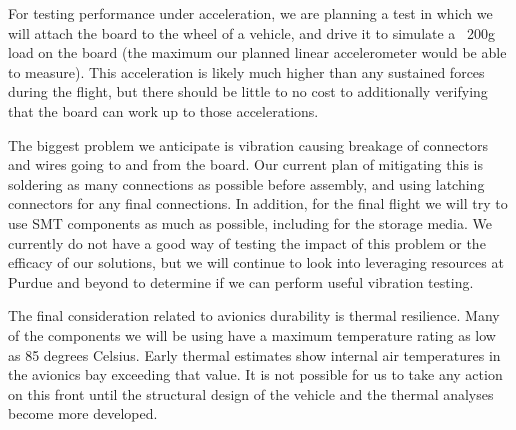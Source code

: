 For testing performance under acceleration, we are planning a test in which we will attach the board to the wheel of a vehicle, and drive it to simulate a ~200g load on the board (the maximum our planned linear accelerometer would be able to measure). This acceleration is likely much higher than any sustained forces during the flight, but there should be little to no cost to additionally verifying that the board can work up to those accelerations.

The biggest problem we anticipate is vibration causing breakage of connectors and wires going to and from the board. Our current plan of mitigating this is soldering as many connections as possible before assembly, and using latching connectors for any final connections. In addition, for the final flight we will try to use SMT components as much as possible, including for the storage media. We currently do not have a good way of testing the impact of this problem or the efficacy of our solutions, but we will continue to look into leveraging resources at Purdue and beyond to determine if we can perform useful vibration testing.

The final consideration related to avionics durability is thermal resilience. Many of the components we will be using have a maximum temperature rating as low as 85 degrees Celsius. Early thermal estimates show internal air temperatures in the avionics bay exceeding that value. It is not possible for us to take any action on this front until the structural design of the vehicle and the thermal analyses become more developed.

